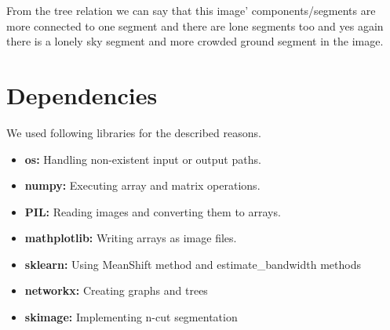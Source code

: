 \documentclass[conference]{IEEEtran}
\begin{document}
From the tree relation we can say that this image' components/segments are more connected to one segment and there are lone segments too and yes again there is a lonely sky segment and more crowded ground segment in the image.

\section{Dependencies}
We used following libraries for the described reasons.
\begin{itemize}
	\item \textbf{os:} Handling non-existent input or output paths.
	\item \textbf{numpy:} Executing array and matrix operations.
	\item \textbf{PIL:} Reading images and converting them to arrays.
	\item \textbf{mathplotlib:} Writing arrays as image files.
    \item \textbf{sklearn:} Using MeanShift method and estimate\_bandwidth methods
    \item \textbf{networkx:} Creating graphs and trees
    \item \textbf{skimage:} Implementing n-cut segmentation
        
\end{itemize}
\end{document}
